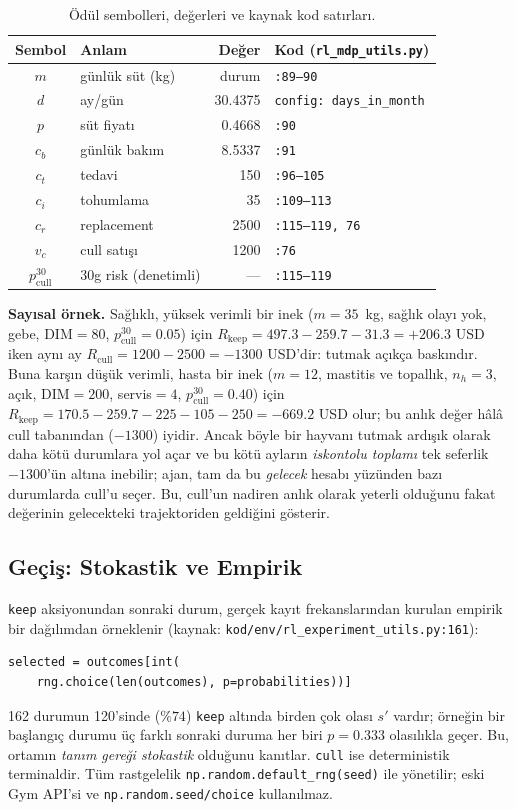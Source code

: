 \documentclass[conference]{IEEEtran}
\begin{document}
\begin{table}[t]
\caption{Ödül sembolleri, değerleri ve kaynak kod satırları.}
\label{tab:reward}
\centering\footnotesize
\begin{tabular}{@{}clr l@{}}
\toprule
Sembol & Anlam & Değer & Kod (\texttt{rl\_mdp\_utils.py}) \\
\midrule
$m$ & günlük süt (kg) & durum & \texttt{:89--90} \\
$d$ & ay/gün & 30.4375 & \texttt{config: days\_in\_month} \\
$p$ & süt fiyatı & 0.4668 & \texttt{:90} \\
$c_b$ & günlük bakım & 8.5337 & \texttt{:91} \\
$c_t$ & tedavi & 150 & \texttt{:96--105} \\
$c_i$ & tohumlama & 35 & \texttt{:109--113} \\
$c_r$ & replacement & 2500 & \texttt{:115--119, 76} \\
$v_c$ & cull satışı & 1200 & \texttt{:76} \\
$p^{30}_{\text{cull}}$ & 30g risk (denetimli) & --- & \texttt{:115--119} \\
\bottomrule
\end{tabular}
\end{table}

\textbf{Sayısal örnek.} Sağlıklı, yüksek verimli bir inek ($m\!=\!35$~kg, sağlık olayı yok,
gebe, DIM$=\!80$, $p^{30}_{\text{cull}}\!=\!0.05$) için
$R_{\text{keep}}=497.3-259.7-31.3=+206.3$ USD iken aynı ay
$R_{\text{cull}}=1200-2500=-1300$ USD'dir: tutmak açıkça baskındır. Buna karşın düşük
verimli, hasta bir inek ($m\!=\!12$, mastitis ve topallık, $n_h\!=\!3$, açık, DIM$=\!200$,
servis$=\!4$, $p^{30}_{\text{cull}}\!=\!0.40$) için
$R_{\text{keep}}=170.5-259.7-225-105-250=-669.2$ USD olur; bu anlık değer hâlâ cull
tabanından ($-1300$) iyidir. Ancak böyle bir hayvanı tutmak ardışık olarak daha kötü
durumlara yol açar ve bu kötü ayların \emph{iskontolu toplamı} tek seferlik $-1300$'ün
altına inebilir; ajan, tam da bu \emph{gelecek} hesabı yüzünden bazı durumlarda cull'u
seçer. Bu, cull'un nadiren anlık olarak yeterli olduğunu fakat değerinin gelecekteki
trajektoriden geldiğini gösterir.

\subsection{Geçiş: Stokastik ve Empirik}
\label{sec:transition}
\texttt{keep} aksiyonundan sonraki durum, gerçek kayıt frekanslarından kurulan empirik
bir dağılımdan örneklenir (kaynak: \texttt{kod/env/rl\_experiment\_utils.py:161}):
\begin{lstlisting}
selected = outcomes[int(
    rng.choice(len(outcomes), p=probabilities))]
\end{lstlisting}
162 durumun 120'sinde ($\%74$) \texttt{keep} altında birden çok olası $s'$ vardır; örneğin
bir başlangıç durumu üç farklı sonraki duruma her biri $p\!=\!0.333$ olasılıkla geçer.
Bu, ortamın \emph{tanım gereği stokastik} olduğunu kanıtlar. \texttt{cull} ise
deterministik terminaldir. Tüm rastgelelik \texttt{np.random.default\_rng(seed)} ile
yönetilir; eski Gym API'si ve \texttt{np.random.seed/choice} kullanılmaz.
\end{document}
